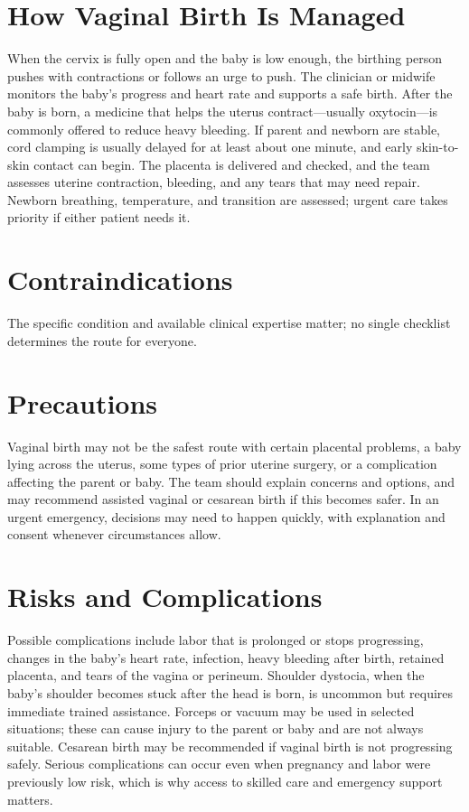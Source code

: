 \section*{How Vaginal Birth Is Managed}
When the cervix is fully open and the baby is low enough, the birthing person pushes with contractions or follows an urge to push. The clinician or midwife monitors the baby's progress and heart rate and supports a safe birth. After the baby is born, a medicine that helps the uterus contract—usually oxytocin—is commonly offered to reduce heavy bleeding. If parent and newborn are stable, cord clamping is usually delayed for at least about one minute, and early skin-to-skin contact can begin. The placenta is delivered and checked, and the team assesses uterine contraction, bleeding, and any tears that may need repair. Newborn breathing, temperature, and transition are assessed; urgent care takes priority if either patient needs it.

\section*{Contraindications}
The specific condition and available clinical expertise matter; no single checklist determines the route for everyone.

\section*{Precautions}
Vaginal birth may not be the safest route with certain placental problems, a baby lying across the uterus, some types of prior uterine surgery, or a complication affecting the parent or baby. The team should explain concerns and options, and may recommend assisted vaginal or cesarean birth if this becomes safer. In an urgent emergency, decisions may need to happen quickly, with explanation and consent whenever circumstances allow.

\section*{Risks and Complications}
Possible complications include labor that is prolonged or stops progressing, changes in the baby's heart rate, infection, heavy bleeding after birth, retained placenta, and tears of the vagina or perineum. Shoulder dystocia, when the baby's shoulder becomes stuck after the head is born, is uncommon but requires immediate trained assistance. Forceps or vacuum may be used in selected situations; these can cause injury to the parent or baby and are not always suitable. Cesarean birth may be recommended if vaginal birth is not progressing safely. Serious complications can occur even when pregnancy and labor were previously low risk, which is why access to skilled care and emergency support matters.

